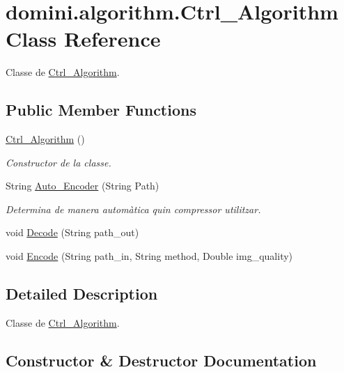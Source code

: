 \hypertarget{classdomini_1_1algorithm_1_1Ctrl__Algorithm}{}\section{domini.\+algorithm.\+Ctrl\+\_\+\+Algorithm Class Reference}
\label{classdomini_1_1algorithm_1_1Ctrl__Algorithm}


Classe de \hyperlink{classdomini_1_1algorithm_1_1Ctrl__Algorithm}{Ctrl\+\_\+\+Algorithm}.  


\subsection*{Public Member Functions}
\begin{DoxyCompactItemize}
\item 
\hyperlink{classdomini_1_1algorithm_1_1Ctrl__Algorithm_aa625781819b57512a3e42df15a3b2ffb}{Ctrl\+\_\+\+Algorithm} ()
\begin{DoxyCompactList}\small\item\em Constructor de la classe. \end{DoxyCompactList}\item 
String \hyperlink{classdomini_1_1algorithm_1_1Ctrl__Algorithm_a6f7a706e07d4e6f8c1ea293d06e17318}{Auto\+\_\+\+Encoder} (String Path)
\begin{DoxyCompactList}\small\item\em Determina de manera automàtica quin compressor utilitzar. \end{DoxyCompactList}\item 
void \hyperlink{classdomini_1_1algorithm_1_1Ctrl__Algorithm_a344b213ee2eb3e0ed3306883624c5128}{Decode} (String path\+\_\+out)
\item 
void \hyperlink{classdomini_1_1algorithm_1_1Ctrl__Algorithm_ac03e09b1fd22f0857bf766fc692efc33}{Encode} (String path\+\_\+in, String method, Double img\+\_\+quality)
\end{DoxyCompactItemize}


\subsection{Detailed Description}
Classe de \hyperlink{classdomini_1_1algorithm_1_1Ctrl__Algorithm}{Ctrl\+\_\+\+Algorithm}. 

\subsection{Constructor \& Destructor Documentation}
\mbox{\label{classdomini_1_1algorithm_1_1Ctrl__Algorithm_aa625781819b57512a3e42df15a3b2ffb}} 
